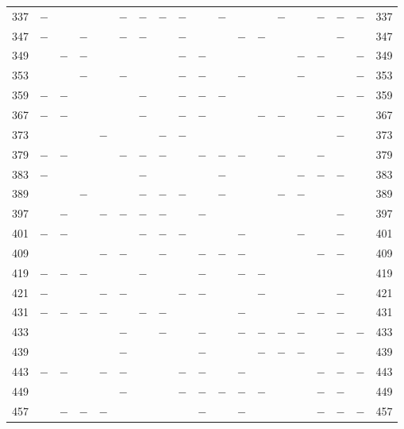 \begin{center}
\begin{tabular}{r|c|c|c|c|c|c|c|c|c|c|c|c|c|c|c|c|c|r}
337 & $-$ &  &  &  & $-$ & $-$ & $-$ & $-$ &  & $-$ &  &  & $-$ &  & $-$ & $-$ & $-$ & 337\\
347 & $-$ &  & $-$ &  & $-$ & $-$ &  & $-$ &  &  & $-$ & $-$ &  &  &  & $-$ &  & 347\\
349 &  & $-$ & $-$ &  &  &  &  & $-$ & $-$ &  &  &  &  & $-$ & $-$ &  & $-$ & 349\\
353 &  &  & $-$ &  & $-$ &  &  & $-$ & $-$ &  & $-$ &  &  & $-$ &  &  & $-$ & 353\\
359 & $-$ & $-$ &  &  &  & $-$ &  & $-$ & $-$ & $-$ &  &  &  &  &  & $-$ & $-$ & 359\\
367 & $-$ & $-$ &  &  &  & $-$ &  & $-$ & $-$ &  &  & $-$ & $-$ &  & $-$ & $-$ &  & 367\\
373 &  &  &  & $-$ &  &  & $-$ & $-$ &  &  &  &  &  &  &  & $-$ &  & 373\\
379 & $-$ & $-$ &  &  & $-$ & $-$ & $-$ &  & $-$ & $-$ & $-$ &  & $-$ &  & $-$ &  &  & 379\\
383 & $-$ &  &  &  &  & $-$ &  &  &  & $-$ &  &  &  & $-$ & $-$ & $-$ &  & 383\\
389 &  &  & $-$ &  &  & $-$ & $-$ & $-$ &  & $-$ &  &  & $-$ & $-$ &  &  &  & 389\\
397 &  & $-$ &  & $-$ & $-$ & $-$ & $-$ &  & $-$ &  &  &  &  &  &  & $-$ &  & 397\\
401 & $-$ & $-$ &  &  &  & $-$ & $-$ & $-$ &  &  & $-$ &  &  & $-$ &  & $-$ &  & 401\\
409 &  &  &  & $-$ & $-$ &  & $-$ &  & $-$ & $-$ & $-$ &  &  &  & $-$ & $-$ &  & 409\\
419 & $-$ & $-$ & $-$ &  &  & $-$ &  &  & $-$ &  & $-$ & $-$ &  &  &  &  &  & 419\\
421 & $-$ &  &  & $-$ & $-$ &  &  & $-$ & $-$ &  &  & $-$ &  &  &  & $-$ &  & 421\\
431 & $-$ & $-$ & $-$ & $-$ &  & $-$ & $-$ &  &  &  & $-$ &  &  & $-$ & $-$ & $-$ &  & 431\\
433 &  &  &  &  & $-$ &  & $-$ &  & $-$ &  & $-$ & $-$ & $-$ & $-$ &  & $-$ & $-$ & 433\\
439 &  &  &  &  & $-$ &  &  &  & $-$ &  &  & $-$ & $-$ & $-$ &  & $-$ &  & 439\\
443 & $-$ & $-$ &  & $-$ & $-$ &  &  & $-$ & $-$ &  & $-$ &  &  &  & $-$ & $-$ & $-$ & 443\\
449 &  &  &  &  & $-$ &  &  & $-$ & $-$ & $-$ & $-$ & $-$ &  &  & $-$ & $-$ &  & 449\\
457 &  & $-$ & $-$ & $-$ &  &  &  &  & $-$ &  & $-$ &  &  &  & $-$ & $-$ & $-$ & 457\\

\end{tabular}
\end{center}
